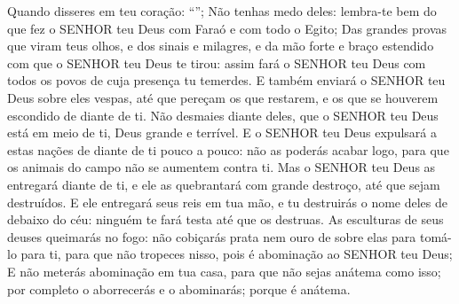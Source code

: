 {{  Quando disseres em teu coração: \enquote{};
  Não tenhas medo deles: lembra-te bem do que fez o SENHOR teu Deus com Faraó e com todo o Egito;
  Das grandes provas que viram teus olhos, e dos sinais e milagres, e da mão forte e braço estendido com que o SENHOR teu Deus te tirou: assim fará o SENHOR teu Deus com todos os povos de cuja presença tu temerdes.
  E também enviará o SENHOR teu Deus sobre eles vespas, até que pereçam os que restarem, e os que se houverem escondido de diante de ti.
  Não desmaies diante deles, que o SENHOR teu Deus está em meio de ti, Deus grande e terrível.
  E o SENHOR teu Deus expulsará a estas nações de diante de ti pouco a pouco: não as poderás acabar logo, para que os animais do campo não se aumentem contra ti.
  Mas o SENHOR teu Deus as entregará diante de ti, e ele as quebrantará com grande destroço, até que sejam destruídos.
  E ele entregará seus reis em tua mão, e tu destruirás o nome deles de debaixo do céu: ninguém te fará testa até que os destruas.
  As esculturas de seus deuses queimarás no fogo: não cobiçarás prata nem ouro de sobre elas para tomá-lo para ti, para que não tropeces nisso, pois é abominação ao SENHOR teu Deus;
  E não meterás abominação em tua casa, para que não sejas anátema como isso; por completo o aborrecerás e o abominarás; porque é anátema}.
\par }

